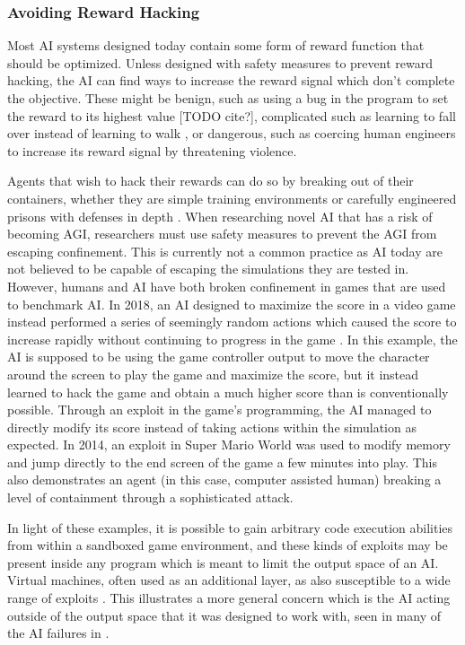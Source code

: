 \documentclass[11pt]{article}
\begin{document}
\subsubsection{Avoiding Reward Hacking}

Most AI systems designed today contain some form of reward function that should be optimized. Unless
designed with safety measures to prevent reward hacking, the AI can find ways to increase the reward
signal which don't complete the objective. These might be benign, such as using a bug in the program
to set the reward to its highest value [TODO cite?], complicated such as learning to fall over
instead of learning to walk \cite{lehman2018surprising}, or dangerous, such as coercing human
engineers to increase its reward signal by threatening violence.

Agents that wish to hack their rewards can do so by breaking out of their containers, whether they
are simple training environments or carefully engineered prisons with defenses in depth
\cite{james2016containment}.  When researching novel AI that has a risk of becoming AGI, researchers
must use safety measures to prevent the AGI from escaping confinement. This is currently not a
common practice as AI today are not believed to be capable of escaping the simulations they are
tested in. However, humans and AI have both broken confinement in games that are used to benchmark
AI. In 2018, an AI designed to maximize the score in a video game instead performed a series of
seemingly random actions which caused the score to increase rapidly without continuing to progress
in the game \cite{chrabaszcz2018qbert}. In this example, the AI is supposed to be using the game
controller output to move the character around the screen to play the game and maximize the score,
but it instead learned to hack the game and obtain a much higher score than is conventionally
possible.  Through an exploit in the game's programming, the AI managed to directly modify its score
instead of taking actions within the simulation as expected. In 2014, an exploit in Super Mario
World was used to modify memory and jump directly to the end screen of the game a few minutes into
play. This also demonstrates an agent (in this case, computer assisted human) breaking a level of
containment through a sophisticated attack.

In light of these examples, it is possible to gain arbitrary code execution abilities from within a
sandboxed game environment, and these kinds of exploits may be present inside any program which is
meant to limit the output space of an AI. Virtual machines, often used as an additional layer, as
also susceptible to a wide range of exploits \cite{reuben2007virtual}.  This illustrates a more
general concern which is the AI acting outside of the output space that it was designed to work
with, seen in many of the AI failures in \cite{yam2018historic}.
\end{document}
